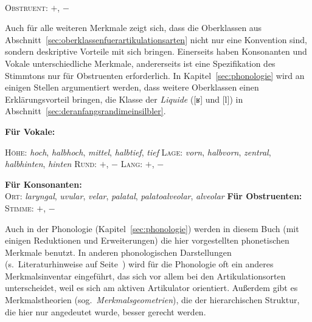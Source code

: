 \begin{exe}
  \\
    \textsc{Obstruent}: $+$, $-$
\end{exe}

Auch für alle weiteren Merkmale zeigt sich, dass die Oberklassen aus Abschnitt~\ref{sec:oberklassenfuerartikulationsarten} nicht nur eine Konvention sind, sondern deskriptive Vorteile mit sich bringen.
Einerseits haben Konsonanten und Vokale unterschiedliche Merkmale, andererseits ist eine Spezifikation des Stimmtons nur für Obstruenten erforderlich.
In Kapitel~\ref{sec:phonologie} wird an einigen Stellen argumentiert werden, dass weitere Oberklassen einen Erklärungsvorteil bringen, \zB die Klasse der \textit{Liquide} ([ʁ] und [l]) in Abschnitt~\ref{sec:deranfangsrandimeinsilbler}.

\begin{exe}
  \ex \textbf{Für Vokale:}
    \begin{xlist}
      \ex \textsc{Höhe}: \textit{hoch}, \textit{halbhoch}, \textit{mittel}, \textit{halbtief}, \textit{tief}
      \ex \textsc{Lage}: \textit{vorn}, \textit{halbvorn}, \textit{zentral}, \textit{halbhinten}, \textit{hinten}
      \ex \textsc{Rund}: $+$, $-$
      \ex \textsc{Lang}: $+$, $-$
    \end{xlist}
  \ex \textbf{Für Konsonanten:}\\
      \textsc{Ort}: \textit{laryngal}, \textit{uvular}, \textit{velar}, \textit{palatal}, \textit{palatoalveolar}, \textit{alveolar}
  \ex \textbf{Für Obstruenten:}\\
    \textsc{Stimme}: $+$, $-$
\end{exe}

Auch in der Phonologie (Kapitel~\ref{sec:phonologie}) werden in diesem Buch (mit einigen Reduktionen und Erweiterungen) die hier vorgestellten phonetischen Merkmale benutzt.
In anderen phonologischen Darstellungen (s.\ Literaturhinweise auf Seite~\pageref{abs:001}) wird für die Phonologie oft ein anderes Merkmalsinventar eingeführt, das sich vor allem bei den Artikulationsorten unterscheidet, weil es sich am aktiven Artikulator orientiert.
Außerdem gibt es Merkmalstheorien (sog.\ \textit{Merkmalsgeometrien}), die der hierarchischen Struktur, die hier nur angedeutet wurde, besser gerecht werden.


